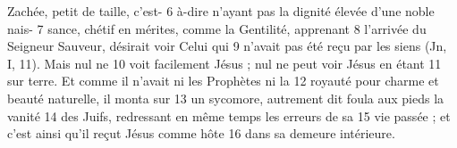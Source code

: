 Zachée, petit de taille, c'est-	 
6	 	à-dire n'ayant pas la dignité élevée d'une noble nais-	 
7	 	sance, chétif en mérites, comme la Gentilité, apprenant	 
8	 	l'arrivée du Seigneur Sauveur, désirait voir Celui qui	 
9	 	n'avait pas été reçu par les siens (Jn, I, 11). Mais nul ne	 
10	 	voit facilement Jésus ; nul ne peut voir Jésus en étant	 
11	 	sur terre. Et comme il n'avait ni les Prophètes ni la	 
12	 	royauté pour charme et beauté naturelle, il monta sur	 
13	 	un sycomore, autrement dit foula aux pieds la vanité	 
14	 	des Juifs, redressant en même temps les erreurs de sa	 
15	 	vie passée ; et c'est ainsi qu'il reçut Jésus comme hôte	 
16	 	dans sa demeure intérieure.